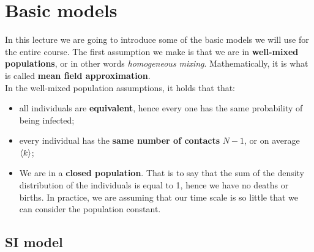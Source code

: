 \documentclass[../main/main.tex]{subfiles}
\begin{document}

\section{Basic models}

In this lecture we are going to introduce some of the basic models we will use for the entire course. The first assumption we make is that we are in \textbf{well-mixed populations}, or in other words \textit{homogeneous mixing}. Mathematically, it is what is called \textbf{mean field approximation}.\\
In the well-mixed population assumptions, it holds that that:
\begin{itemize}
\item all individuals are \textbf{equivalent}, hence every one has the same probability of being infected;
\item every individual has the \textbf{same number of contacts} $N-1$, or on average $\expval{k}$;
\item We are in a \textbf{closed population}. That is to say that the sum of the density distribution of the individuals is equal to 1, hence we have no deaths or births. In practice, we are assuming that our time scale is so little that we can consider the population constant.
\end{itemize}

\subsection{SI model}
\end{document}
